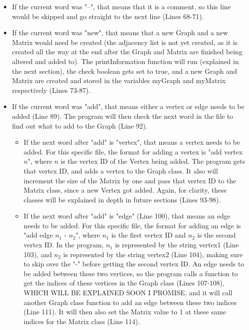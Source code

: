 \documentclass[letterpaper, 10pt]{article}
\begin{document}
\begin{itemize}
    \item If the current word was "--", that means that it is a comment, so this line would be skipped and go straight to the next line (Lines 68-71).
    \item If the current word was "new", that means that a new Graph and a new Matrix would need be created (the adjacency list is not yet created, as it is created all the way at the end after the Graph and Matrix are finished being altered and added to). The printInformation function will run (explained in the next section), the check boolean gets set to true, and a new Graph and Matrix are created and stored in the variables myGraph and myMatrix respectively (Lines 73-87).
    \item If the current word was "add", that means either a vertex or edge needs to be added (Line 89). The program will then check the next word in the file to find out what to add to the Graph (Line 92).
    \begin{itemize}
        \item If the next word after "add" is "vertex", that means a vertex needs to be added. For this specific file, the format for adding a vertex is "add vertex $n$", where $n$ is the vertex ID of the Vertex being added. The program gets that vertex ID, and adds a vertex to the Graph class. It also will increment the size of the Matrix by one and pass that vertex ID to the Matrix class, since a new Vertex got added. Again, for clarity, these classes will be explained in depth in future sections (Lines 93-98).
        \item If the next word after "add" is "edge" (Line 100), that means an edge needs to be added. For this specific file, the format for adding an edge is "add edge $n_1$ - $n_2$", where $n_1$ is the first vertex ID and $n_2$ is the second vertex ID. In the program, $n_1$ is represented by the string vertex1 (Line 103), and $n_2$ is represented by the string vertex2 (Line 104), making sure to skip over the "-" before getting the second vertex ID. An edge needs to be added between these two vertices, so the program calls a function to get the indices of these vertices in the Graph class (Lines 107-108), WHICH WILL BE EXPLAINED SOON I PROMISE. and it will call another Graph class function to add an edge between these two indices (Line 111). It will then also set the Matrix value to 1 at these same indices for the Matrix class (Line 114). 
    \end{itemize}
\end{itemize}
\end{document}
